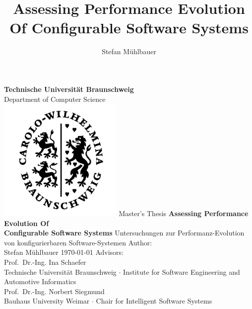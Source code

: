 \documentclass[
	12pt,
	a4paper,
	oneside,
	openright
]{book}
\title{Assessing Performance Evolution Of Configurable Software Systems}
\author{Stefan Mühlbauer}
\begin{document}
\newtheorem{definition}{Def.~}[section]

\begin{titlepage}
    \centering
    {
    	\textbf{Technische Universität Braunschweig}\\ 
    		\vspace{2mm}
    	Department of Computer Science
    }
    \vspace{1.5cm}\\
    \includegraphics[width=6cm]{images/SiegelTU.png}%
    \vfill
    Master's Thesis
    \vfill
    {\bfseries\Huge\linespread{2.0}
        Assessing Performance Evolution Of\\
        	\vspace{3mm}
         Configurable Software Systems
    }  
    \vfill
    {Untersuchungen zur Performanz-Evolution von konfigurierbaren
    Software-Systemen}
    \vfill
    {
    	Author:\\
    	\vspace{3mm}
    	{\Large Stefan Mühlbauer}
    }
    \vfill
    \today
    \vfill
    Advisors:\\
    \vspace{3mm}
    {\large Prof.~Dr.-Ing. Ina Schaefer}\\
    \vspace{1mm}
    {Technische Universität Braunschweig $\cdot$ Institute for Software
    Engineering and Automotive Informatics}\\
    \vspace{3mm}
    {\large Prof.~Dr.-Ing. Norbert Siegmund}\\
    \vspace{1mm}
    {Bauhaus University Weimar $\cdot$ Chair for Intelligent Software Systems}
\end{titlepage}
\end{document}
